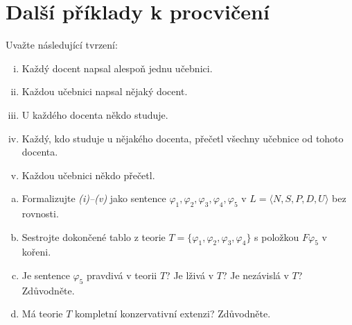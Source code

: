 \section*{Další příklady k procvičení}


\begin{problem}
    
    Uvažte následující tvrzení:
    \begin{enumerate}[(i)]\it
        \item Každý docent napsal alespoň jednu učebnici.
        \item Každou učebnici napsal nějaký docent.
        \item U každého docenta někdo studuje.
        \item Každý, kdo studuje u nějakého docenta, přečetl všechny učebnice od tohoto docenta.
        \item Každou učebnici někdo přečetl.
    \end{enumerate}    
    \begin{enumerate}[(a)]
        \item Formalizujte {\it(i)--(v)} jako sentence $\varphi_1,\varphi_2,\varphi_3,\varphi_4,\varphi_5$ v $L=\langle N, S, P, D, U\rangle$ bez rovnosti.
        \item Sestrojte dokončené tablo z teorie $T=\{\varphi_1,\varphi_2,\varphi_3,\varphi_4\}$ s položkou $F\varphi_5$ v kořeni.
        \item Je sentence $\varphi_5$ pravdivá v teorii $T$? Je lživá v $T$? Je nezávislá v $T$? Zdůvodněte.
        \item Má teorie $T$ kompletní konzervativní extenzi? Zdůvodněte.
    \end{enumerate}

\end{problem}


